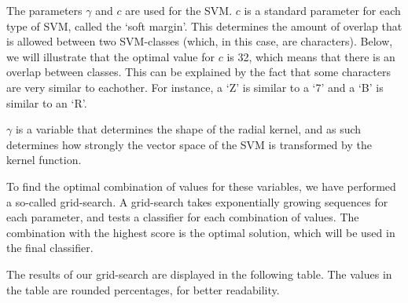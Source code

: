 \documentclass[a4paper]{article}
\begin{document}
The parameters $\gamma$ and $c$ are used for the SVM. $c$ is a standard
parameter for each type of SVM, called the `soft margin'. This determines the
amount of overlap that is allowed between two SVM-classes (which, in this case,
are characters). Below, we will illustrate that the optimal value for $c$ is
32, which means that there is an overlap between classes. This can be explained
by the fact that some characters are very similar to eachother. For instance, a
`Z' is similar to a `7' and a `B' is similar to an `R'.

$\gamma$ is a variable that determines the shape of the radial kernel, and as
such determines how strongly the vector space of the SVM is transformed by the
kernel function.

To find the optimal combination of values for these variables, we have
performed a so-called grid-search. A grid-search takes exponentially growing
sequences for each parameter, and tests a classifier for each combination of
values. The combination with the highest score is the optimal solution, which
will be used in the final classifier.

The results of our grid-search are displayed in the following table. The values
in the table are rounded percentages, for better readability.
\end{document}
